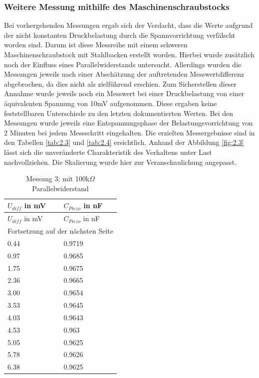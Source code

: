 \documentclass[12pt]{scrreprt} %
\begin{document}
\subsubsection{Weitere Messung mithilfe des Maschinenschraubstocks}
Bei vorhergehenden Messungen ergab sich der Verdacht, dass die Werte aufgrund der nicht konstanten Druckbelastung durch die Spannvorrichtung verfälscht worden sind. Darum ist diese Messreihe mit einem schweren Maschinenschraubstock mit Stahlbacken erstellt worden. Hierbei wurde zusätzlich noch der Einfluss eines Parallelwiderstands untersucht. Allerdings wurden die Messungen jeweils nach einer Abschätzung der auftretenden Messwertdifferenz abgebrochen, da dies nicht als zielführend erschien. Zum Sicherstellen dieser Annahme wurde jeweils noch ein Messwert bei einer Druckbelastung von einer äquivalenten Spannung von 10mV aufgenommen. Diese ergaben keine feststellbaren Unterschiede zu den letzten dokumentierten Werten. Bei den Messungen wurde jeweils eine Entspannungsphase der Belastungsvorrichtung von 2 Minuten bei jedem Messschritt eingehalten. Die erzielten Messergebnisse sind in den Tabellen \vref{tab:2.3} und \vref{tab:2.4} ersichtlich. Anhand der Abbildung \vref{fig:2.3} lässt sich die unveränderte Charakteristik des Verhaltens unter Last nachvollziehen. Die Skalierung wurde hier zur Veranschaulichung angepasst. 

\setlongtables
\begin{longtable}{| l | l |}
\caption{Messung 3; mit 100k$\Omega$ Parallelwiderstand}\\
\hline
$U_{diff}$ in mV&$C_{Piezo}$ in nF\\
\hline
\endfirsthead
\hline
$U_{diff}$ in mV&$C_{Piezo}$ in nF\\
\hline
\endhead
\hline
\multicolumn{2}{|c|}{Fortsetzung auf der nächsten Seite}\\
\hline
\endfoot
\hline \hline
\endlastfoot
\hline
\label{tab:2.3}%
0.44&0.9719\\
0.97&0.9685\\
1.75&0.9675\\
2.36&0.9665\\
3.00&0.9654\\
3.53&0.9645\\
4.03&0.9643\\
4.53&0.963\\
5.05&0.9625\\
5.78&0.9626\\
6.38&0.9625\\
\end{longtable}
\end{document}
